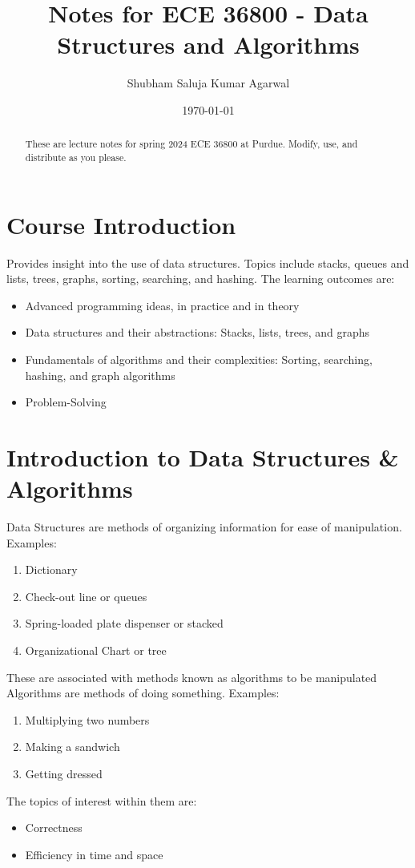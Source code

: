 \documentclass[nobib]{tufte-handout}
\title{Notes for ECE 36800 - Data Structures and Algorithms}
\author[Shubham Saluja Kumar Agarwal]{Shubham Saluja Kumar Agarwal}
\date{\today}  %
\begin{document}
\maketitle

\begin{abstract}
    These are lecture notes for spring 2024 ECE 36800 at Purdue. Modify, use, and distribute as you please.
\end{abstract}

\tableofcontents

\section{Course Introduction}
Provides insight into the use of data structures. Topics include stacks, queues
and lists, trees, graphs, sorting, searching, and hashing. The learning
outcomes are:
\begin{itemize}
    \item Advanced programming ideas, in practice and in theory
    \item Data structures and their abstractions: Stacks, lists, trees, and graphs
    \item Fundamentals of algorithms and their complexities: Sorting, searching, hashing,
          and graph algorithms
    \item Problem-Solving
\end{itemize}
\pagebreak

\section{Introduction to Data Structures \& Algorithms}
Data Structures are methods of organizing information for ease of manipulation.
Examples:
\begin{enumerate}
    \item Dictionary
    \item Check-out line or queues
    \item Spring-loaded plate dispenser or stacked
    \item Organizational Chart or tree
\end{enumerate}
These are associated with methods known as algorithms to be manipulated\\
Algorithms are methods of doing something.
Examples:
\begin{enumerate}
    \item Multiplying two numbers
    \item Making a sandwich
    \item Getting dressed
\end{enumerate}
The topics of interest within them are:\\
\begin{itemize}
    \item Correctness
    \item Efficiency in time and space
\end{itemize}
\end{document}
